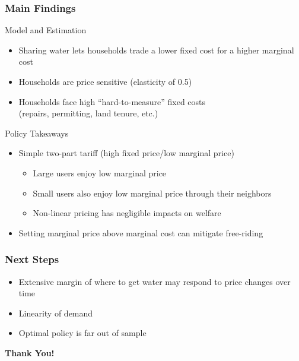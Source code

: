 \documentclass[aspectratio=149]{beamer}
\begin{document}
\begin{frame}
\frametitle{Main Findings}

Model and Estimation
\begin{itemize}
  \item Sharing water lets households trade a lower fixed cost for a higher marginal cost
  \item Households are price sensitive (elasticity of 0.5)
  \item Households face high ``hard-to-measure'' fixed costs \\
   (repairs, permitting, land tenure, etc.)
\end{itemize}

\vspace{.2cm}

Policy Takeaways
\begin{itemize}
  \item Simple two-part tariff (high fixed price/low marginal price)
    \begin{itemize}
      \item Large users enjoy low marginal price
      \item Small users also enjoy low marginal price through their neighbors
      \item Non-linear pricing has negligible impacts on welfare
    \end{itemize}
  \item Setting marginal price above marginal cost can mitigate free-riding
\end{itemize}


\end{frame}


\begin{frame}
\frametitle{Next Steps}

\begin{itemize}
  \item Extensive margin of where to get water may respond to price changes over time
  \item Linearity of demand
  \item Optimal policy is far out of sample
\end{itemize}

\end{frame}



\begin{frame}
\begin{center}
\textcolor{navyblue}{\Large \bf Thank You! } 
\end{center}
\end{frame}
\end{document}
